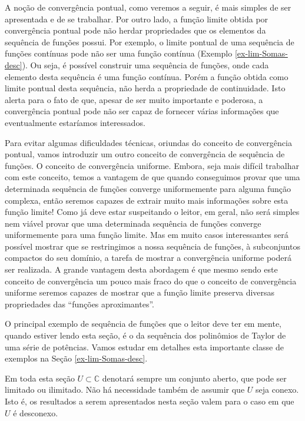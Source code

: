 A noção de convergência pontual, como veremos a seguir, é mais simples de 
ser apresentada e de se trabalhar. Por outro lado, a função limite 
obtida por convergência pontual pode não herdar propriedades que
os elementos da sequência de funções possui. Por exemplo, o limite pontual
de uma sequência de funções contínuas pode não ser uma função contínua
(Exemplo \ref{ex-lim-Somas-desc}). 
Ou seja,
é possível construir uma sequência de funções, onde cada elemento desta sequência é 
uma função contínua. Porém a função obtida como limite pontual desta sequência, 
não herda a propriedade de continuidade. Isto alerta para o fato de
que, apesar de ser muito importante e poderosa, a convergência pontual 
pode não ser capaz de fornecer várias informações que eventualmente estaríamos
interessados. 

Para evitar algumas dificuldades técnicas, oriundas do conceito de convergência pontual,
vamos introduzir um outro conceito de convergência de sequência de funções. O conceito de 
convergência uniforme. Embora, seja mais difícil trabalhar com 
este conceito, temos a vantagem de que 
quando conseguimos provar que uma determinada 
sequência de funções converge uniformemente para alguma função complexa, 
então seremos capazes de extrair muito 
mais informações sobre esta função limite! 
Como já deve estar suspeitando o leitor, em geral, não será simples
nem viável provar que uma determinada sequência de funções converge uniformemente 
para uma função limite. Mas em muito casos interessantes será possível mostrar
que se restringimos a nossa sequência de funções, à subconjuntos compactos do
seu domínio, a tarefa de mostrar a convergência uniforme 
poderá ser realizada. A grande vantagem desta abordagem é que mesmo sendo 
este conceito de convergência um pouco mais fraco do que o conceito de convergência
uniforme seremos capazes de mostrar que a função limite preserva diversas propriedades
das ``funções aproximantes''. 
 

O principal exemplo de sequência de funções que o leitor deve ter em mente,
quando estiver lendo esta seção, é o da sequência dos polinômios de 
Taylor de uma série de potências. Vamos estudar
em detalhes esta importante classe de exemplos na Seção \ref{ex-lim-Somas-desc}.


\bigskip 

Em toda esta seção $U\subset\mathbb{C}$ denotará sempre um  
conjunto aberto, que pode ser limitado ou ilimitado. Não há necessidade 
também de assumir que $U$ seja conexo. Isto é, os resultados a serem 
apresentados nesta seção valem para o caso em que $U$ é desconexo. 


